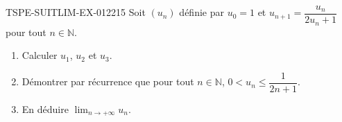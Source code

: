 \begin{exercice}{TSPE-SUITLIM-EX-012}{2}{15}
Soit $(u_n)$ définie par $u_0 = 1$ et $u_{n+1} = \dfrac{u_n}{2u_n + 1}$ pour tout $n \in \mathbb{N}$.
\begin{enumerate}
  \item Calculer $u_1$, $u_2$ et $u_3$.
  \item Démontrer par récurrence que pour tout $n \in \mathbb{N}$, $0 < u_n \leq \dfrac{1}{2n+1}$.
  \item En déduire $\lim_{n \to +\infty} u_n$.
\end{enumerate}
\end{exercice}
